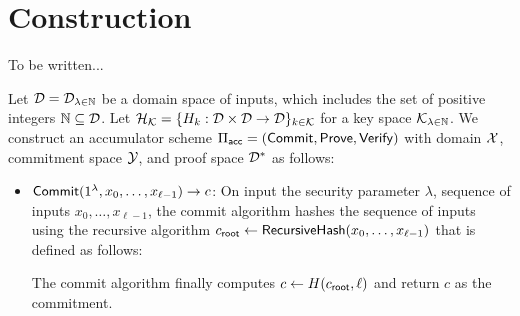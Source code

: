 \section{Construction}

To be written...

\newcommand{\RecursiveHash}{\ms{RecursiveHash}}
\newcommand{\croot}{c_{\ms{root}}}
\newcommand{\cleft}{c_{\ms{left}}}
\newcommand{\cright}{c_{\ms{right}}}
\newcommand{\midi}{\ms{mid}}
\newcommand{\RecursiveProve}{\ms{RecursiveProve}}
\newcommand{\tagleft}{\ms{L}}
\newcommand{\tagright}{\ms{R}}

\begin{construction}
  \label{cons:main}
  Let $\mathcal{D} = \mathcal{D}_{\lambda \in \mathbb{N}}$ be a domain space of inputs, which
  includes the set of positive integers $\mathbb{N} \subseteq \mathcal{D}$. Let $\mathcal{H}_{\mathcal{K}} =
  \{ H_k: \mathcal{D} \times \mathcal{D} \to \mathcal{D}\}_{k \in \mathcal{K}}$ for a key space
  $\mathcal{K}_{\lambda \in \mathbb{N}}$. We construct an accumulator scheme $\Pi_{\mathsf{acc}} =
  (\mathsf{Commit}, \mathsf{Prove}, \mathsf{Verify})$ with domain $\mathcal{X}$, commitment space $\mathcal{Y}$, and
  proof space $\mathcal{D}^*$ as follows:
  \begin{itemize}
    \item $\mathsf{Commit}(1^\lambda, x_0, \ldots, x_{\ell-1}) \to c$: On input the
      security parameter $\lambda$, sequence of inputs $x_0, \ldots,
      x_{\ell-1}$, the commit algorithm hashes the sequence of inputs using
      the recursive algorithm $\croot \gets \RecursiveHash(x_0, \ldots,
      x_{\ell-1})$ that is defined as follows:
      The commit algorithm finally computes $c \gets H(\croot, \ell)$ and return
      $c$ as the commitment.


\end{itemize}
\end{construction}
